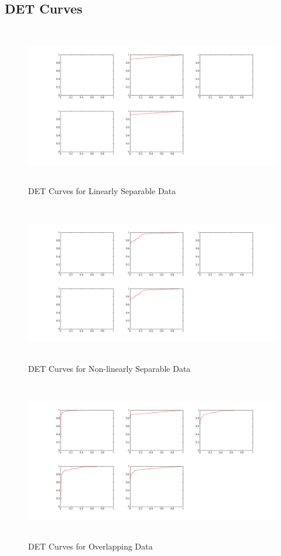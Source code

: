 \documentclass[11pt,a4paper]{article}
\begin{document}
\subsection{DET Curves}
\begin{figure}[H]
		\centering
	\includegraphics[height=7cm]{DET/1.png}
	\caption{DET Curves for Linearly Separable Data}
\end{figure}

\begin{figure}[H]
		\centering
	\includegraphics[height=7cm]{DET/2.png}
	\caption{DET Curves for Non-linearly Separable Data}
\end{figure}

\begin{figure}[H]
		\centering
	\includegraphics[height=7cm]{DET/3.png}
	\caption{DET Curves for Overlapping Data}
\end{figure}
\end{document}
